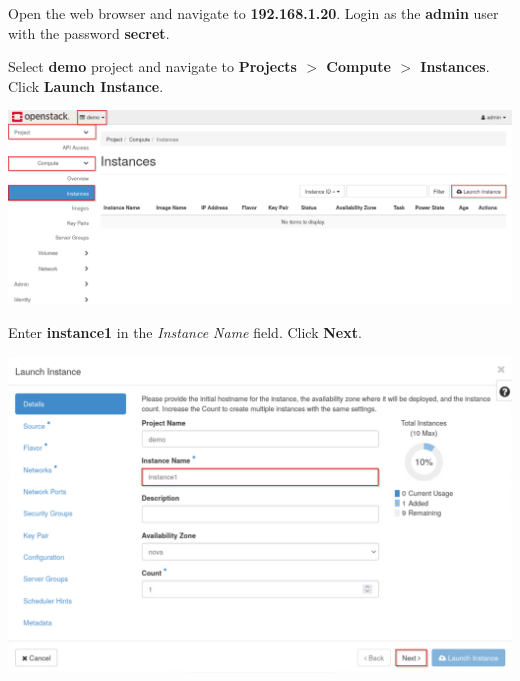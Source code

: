 \documentclass[letterpaper, 12pt]{article}
\begin{document}
\begin{enumerate}
    \begin{labstep}
        Open the web browser and navigate to \textbf{192.168.1.20}.
        Login as the \textbf{admin} user with the password \textbf{secret}.
    \end{labstep}

    \begin{labstep}
        Select \textbf{demo} project and navigate to \textbf{Projects $>$ Compute $>$ Instances}.
        Click \textbf{Launch Instance}.

        \begin{center}
            \includegraphics[width=\linewidth]{images/part4/step2.png}
        \end{center}
    \end{labstep}

    \begin{labstep}
        Enter \textbf{instance1} in the \textit{Instance Name} field.
        Click \textbf{Next}.

        \begin{center}
            \includegraphics[width=\linewidth]{images/part4/step3.png}
        \end{center}
    \end{labstep}


\end{enumerate}
\end{document}
